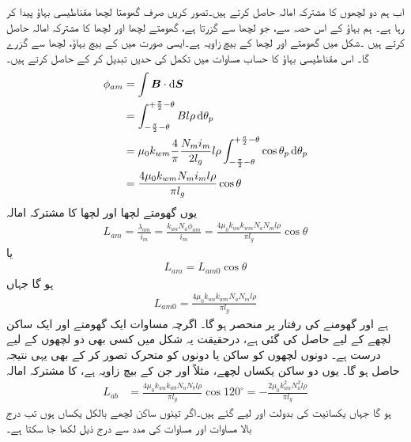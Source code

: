 اب ہم دو لچھوں کا مشترکہ امالہ حاصل کرتے ہیں۔تصور کریں صرف  گھومتا لچھا مقناطیسی بہاؤ پیدا کر رہا ہے۔ ہم  بہاؤ کے اس حصہ سے، جو  لچھا  سے گزرتا ہے، گھومتے لچھا اور  لچھا  کا مشترکہ امالہ حاصل کرتے ہیں ۔شکل   میں گھومتے اور  لچھا کے بیچ زاویہ  ہے۔ایسی صورت میں   کے بیچ بہاؤ،  لچھا سے گزرے گا۔ اس مقناطیسی بہاؤ کا حساب مساوات   میں تکمل کی حدیں تبدیل کر کے حاصل کرتے ہیں۔
\begin{gather}
\begin{aligned}
\phi_{am}&=\int \kvec{B} \cdot \dif \kvec{S}\\
&=\int_{-\frac{\pi}{2}-\theta}^{+\frac{\pi}{2}-\theta} B l \rho \dif \theta_p\\
&=\mu_0 k_{wm} \frac{4}{\pi}\frac{N_m i_m}{2 l_g} l \rho \int_{-\frac{\pi}{2}-\theta}^{+\frac{\pi}{2}-\theta} \cos \theta_p \dif \theta_p\\
&=\frac{4 \mu_0 k_{wm}  N_m i_m l \rho}{\pi l_g} \cos \theta
\end{aligned}
\end{gather}
یوں گھومتے لچھا اور  لچھا کا  مشترکہ امالہ
\begin{align}
L_{am}=\frac{\lambda_{am}}{i_m}=\frac{k_{wa} N_a \phi_{am}}{i_m}=\frac{4 \mu_0 k_{wa} k_{wm} N_a N_m l \rho}{\pi l_g} \cos \theta
\end{align}
یا
\begin{align}\label{مساوات_معاصر_ساکن_گھومتا_مشترکہ_امالہ}
L_{am}=L_{am0} \cos \theta
\end{align}
ہو گا جہاں
\begin{align}
L_{am0}=\frac{4 \mu_0 k_{wa} k_{wm} N_a N_m l \rho}{\pi l_g} 
\end{align}
ہے اور   گھومنے کی رفتار پر منحصر ہو گا۔ اگرچہ مساوات  ایک گھومتے اور ایک ساکن لچھے کے لیے حاصل کی گئی  ہے،  درحقیقت یہ  شکل  میں کسی بھی دو لچھوں کے لیے درست ہے۔  دونوں لچھوں کو ساکن یا دونوں کو متحرک تصور کر کے بھی یہی نتیجہ حاصل ہو گا۔  یوں  دو ساکن  یکساں لچھے، مثلاً  اور  جن کے بیچ   زاویہ ہے،  کا  مشترکہ امالہ
\begin{align}
L_{ab}&=\frac{4 \mu_0 k_{wa} k_{wb} N_a N_b l \rho}{\pi l_g} \cos 120^{\circ}=-\frac{2 \mu_0 k_{wa}^2  N_a^2 l \rho}{\pi l_g}
\end{align}
ہو گا جہاں یکسانیت کی  بدولت   اور  لیے گئے ہیں۔اگر تینوں ساکن لچھے بالکل یکساں ہوں  تب درج بالا مساوات اور مساوات  کی مدد سے درج ذیل  لکھا جا سکتا ہے۔ 

